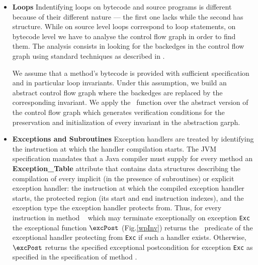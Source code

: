 \begin{itemize}
\item \textbf{Loops}
Indentifying loops on bytecode and source programs is different because of their different nature --- 
the first one lacks while the second has structure. While on source level loops correspond to loop statements,  
on bytecode level we have to analyse the control flow graph in order to find them.
 The analysis consists in looking for the backedges in the control flow graph using standard techniques as described in \cite{ARUCom1986}. 
  
 We assume that a method's bytecode is provided with sufficient specification and in particular loop invariants.
 Under this assumption, we build an abstract control flow graph where the backedges are replaced by
 the corresponding invariant. We apply the \wpi \ function over the abstract version of the control flow graph which generates verification conditions for the 
preservation and initialization of every invariant in the abstraction garph. 


     
\item \textbf{Exceptions and Subroutines}
Exception handlers are treated by identifying the instruction at which the handler compilation starts. The JVM specification mandates 
that a Java compiler must supply for every method an \textbf{Exception\_Table} attribute that contains data structures describing the compilation of
 every implicit (in the presence of subroutines) or explicit exception handler: the instruction at which the compiled exception handler starts,
 the protected region (its start and end instruction indexes), and the exception type the exception handler protects from. Thus, 
for every instruction  in method \method~ which may terminate exceptionally on exception \texttt{Exc} the exceptional function
 $\excPost$ (Fig.\ref{wpInv}) returns the \wpi \ predicate of the exceptional handler protecting  from \texttt{Exc} if such a handler exists.
Otherwise, $\excPost$ returns the specified exceptional postcondition for exception \texttt{Exc} as specified in the specification of
method \method.


\end{itemize}
